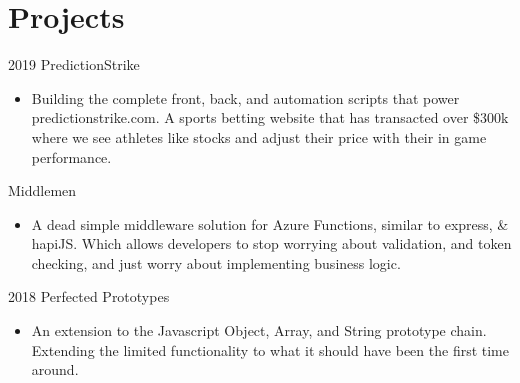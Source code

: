 \documentclass[letterpaper]{twentysecondcv} %
\begin{document}
\section{Projects}
\begin{twenty} 
\twentyitem
    	{2019}
		{}
        {PredictionStrike}
        {}
        {}
        {\begin{itemize}
        \item Building the complete front, back, and automation scripts that power predictionstrike.com. A sports betting website that has transacted over \$300k where we see athletes like stocks and adjust their price with their in game performance. 
        \vspace{1mm}
        \end{itemize}}

\twentyitem
    	{}
		{}
        {Middlemen}
        {}
        {}
        {\begin{itemize}
        \item A dead simple middleware solution for Azure Functions, similar to express, \& hapiJS. Which allows developers to stop worrying about validation, and token checking, and just worry about implementing business logic.
        \vspace{1mm}
        \end{itemize}}

\twentyitem
    	{2018}
		{}
        {Perfected Prototypes}
        {}
        {}
        {\begin{itemize}
        \item An extension to the Javascript Object, Array, and String prototype chain. Extending the limited functionality to what it should have been the first time around. 
        \end{itemize}}
\end{twenty}
\end{document}
